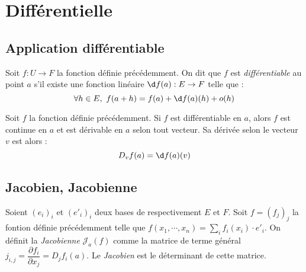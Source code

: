 \documentclass[11pt,a4paper,fleqn,pdftex]{report}
\begin{document}
\section{Différentielle} %
\label{sec:differentielle}
\subsection{Application différentiable} %
\label{sub:application_differentiable}
\begin{dfn}
    Soit $f:U\to F$ la fonction définie précédemment.\newline
    On dit que $f$ est \emph{différentiable} au point $a$ s'il existe une fonction linéaire $\d f(a) : E \to F$ telle que :
    \begin{equation}
    \forall h \in E, \ f(a + h) = f(a) + \d f(a)(h) + o(h)
    \end{equation}
\end{dfn}
\begin{theorem}[$f$ dérivable en $a$]
     Soit $f$ la fonction définie précédemment. \newline
     Si $f$ est différentiable en $a$, alors $f$ est continue en $a$ et est dérivable en $a$ selon tout vecteur. Sa dérivée selon le vecteur $v$ est alors : 
     \begin{equation}
     D_v f(a) = \d f(a)(v)
     \end{equation}
\end{theorem}
\subsection{Jacobien, Jacobienne} %
\label{sub:jacobien_jacobienne}
\begin{dfn}
  Soient $(e_i)_i$ et $(e'_i)_i$ deux bases de respectivement $E$ et $F$.\newline
  Soit $f=(f_j)_j$ la fontion définie précédemment telle que $f(x_1,\cdots,x_n) = \sum_i f_i (x_i)\cdot e'_i$. 
On définit la \emph{Jacobienne} $\mathcal{J}_a(f)$ comme la matrice de terme général $j_{i,j}=\dfrac{\partial f_i}{\partial x_j}=D_jf_i(a)$. \newline
Le \emph{Jacobien} est le déterminant de cette matrice.
\end{dfn}
\end{document}
